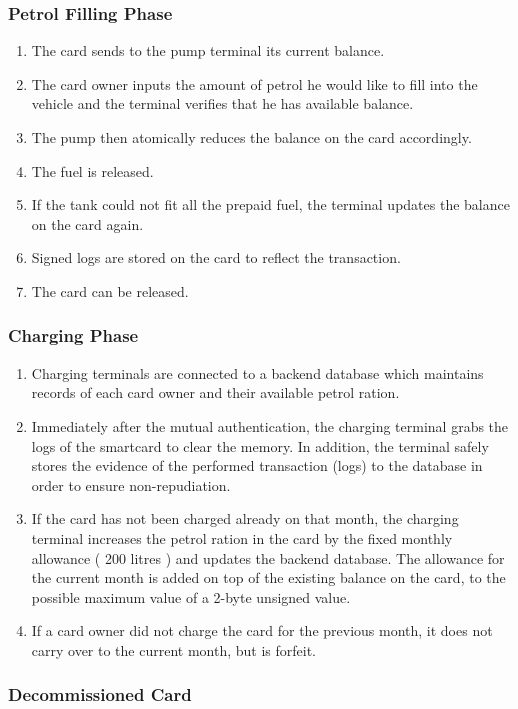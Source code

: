 \documentclass[a4paper,10pt]{llncs}
\begin{document}
\subsubsection{Petrol Filling Phase}
\begin{enumerate}
  \item The card sends to the pump terminal its current balance.
  \item The card owner inputs the amount of petrol he would like to fill into the vehicle and the terminal verifies that he has available balance.
  \item The pump then atomically reduces the balance on the card accordingly.
  \item The fuel is released.
  \item If the tank could not fit all the prepaid fuel, the terminal updates the balance on the card again.
  \item Signed logs are stored on the card to reflect the transaction.
  \item The card can be released.
\end{enumerate}

\subsubsection{Charging Phase}
\begin{enumerate}
  \item Charging terminals are connected to a backend database which maintains records of each card owner and their available petrol ration.
  \item Immediately after the mutual authentication, the charging terminal grabs the logs of the smartcard to clear the memory. In addition, the terminal safely stores the evidence of the performed transaction (logs) to the database in order to ensure non-repudiation.
  \item If the card has not been charged already on that month, the charging terminal increases the petrol ration in the card by the fixed monthly allowance ( 200 litres ) and updates the backend database. The allowance for the current month is added on top of the existing balance on the card, to the possible maximum value of a 2-byte unsigned value.
  \item If a card owner did not charge the card for the previous month, it does not carry over to the current month, but is forfeit.
\end{enumerate}


\subsubsection{Decommissioned Card}
\end{document}
